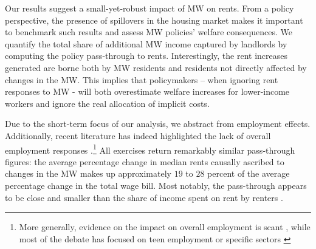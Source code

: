 Our results suggest a small-yet-robust impact of MW on rents. From a policy perspective, 
the presence of spillovers in the housing market makes it important to benchmark such 
results and assess MW policies' welfare consequences.
We quantify the total share of additional MW income captured by landlords 
by computing the policy pass-through to rents. Interestingly, the rent increases generated 
are borne both by MW residents and residents not directly affected by changes in the MW.
This implies that policymakers -- when ignoring rent responses to MW - will both overestimate 
welfare increases for lower-income workers and ignore the real allocation of implicit costs. 

Due to the short-term focus of our analysis, we abstract from employment effects. Additionally, 
recent literature has indeed highlighted the lack of overall employment responses 
\parencite{CegnizEtAl2019}.\footnote{More generally, evidence on the impact on overall 
	employment is scant \parencite{dube2019impacts}, while most of the debate has focused on 
	teen employment \parencite{card1992using, allegretto2017credible} or specific sectors 
	\parencite{katz1992effect, card2000minimum, dube2010minimum}} All exercises return 
remarkably similar pass-through figures: the average percentage change in median rents causally 
ascribed to changes in the MW makes up approximately $19$ to $28$ percent of the average 
percentage change in the total wage bill. Most notably, the pass-through appears to be close and smaller
than the share of income spent on rent by renters \parencite{fernald2020americas}.
